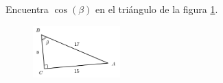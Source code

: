 Encuentra $\cos(\beta)$ en el triángulo de la figura \ref{fig:functrig08}.
\begin{figure}[H]
    \begin{center}
        \includegraphics[width=0.3\textwidth]{../images/functrig08.png}
    \end{center}
    \caption{}
    \label{fig:functrig08}
\end{figure}
